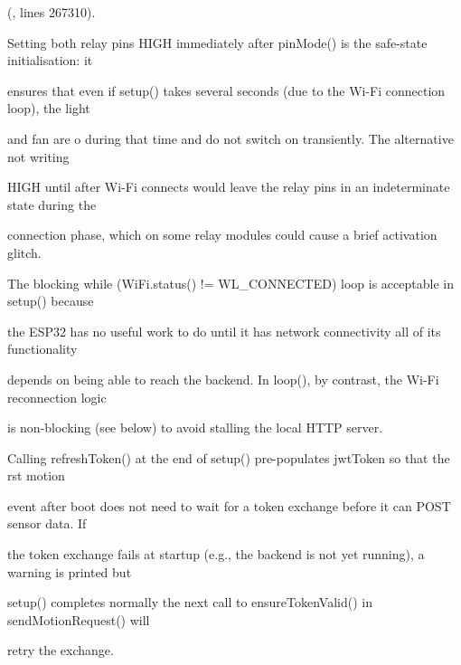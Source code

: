 (, lines 267310).

Setting both relay pins HIGH immediately after pinMode() is the safe-state initialisation: it

ensures that even if setup() takes several seconds (due to the Wi-Fi connection loop), the light

and fan are o during that time and do not switch on transiently. The alternative  not writing

HIGH until after Wi-Fi connects  would leave the relay pins in an indeterminate state during the

connection phase, which on some relay modules could cause a brief activation glitch.

The blocking while (WiFi.status() != WL\_CONNECTED) loop is acceptable in setup() because

the ESP32 has no useful work to do until it has network connectivity  all of its functionality

depends on being able to reach the backend. In loop(), by contrast, the Wi-Fi reconnection logic

is non-blocking (see below) to avoid stalling the local HTTP server.

Calling refreshToken() at the end of setup() pre-populates jwtToken so that the rst motion

event after boot does not need to wait for a token exchange before it can POST sensor data. If

the token exchange fails at startup (e.g., the backend is not yet running), a warning is printed but

setup() completes normally  the next call to ensureTokenValid() in sendMotionRequest() will

retry the exchange.

